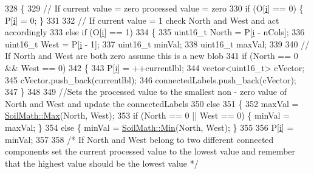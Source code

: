 \begin{DoxyCode}
328             \{
329                 \textcolor{comment}{// If current value = zero processed value = zero}
330                 \textcolor{keywordflow}{if} (O[\hyperlink{_comparision_pictures_2_createtest_image_8m_a6f6ccfcf58b31cb6412107d9d5281426}{i}] == 0) \{ P[\hyperlink{_comparision_pictures_2_createtest_image_8m_a6f6ccfcf58b31cb6412107d9d5281426}{i}] = 0; \}
331 
332                 \textcolor{comment}{// If current value = 1 check North and West and act accordingly}
333                 \textcolor{keywordflow}{else} \textcolor{keywordflow}{if} (O[\hyperlink{_comparision_pictures_2_createtest_image_8m_a6f6ccfcf58b31cb6412107d9d5281426}{i}] == 1)
334                 \{
335                     uint16\_t North = P[\hyperlink{_comparision_pictures_2_createtest_image_8m_a6f6ccfcf58b31cb6412107d9d5281426}{i} - nCols];
336                     uint16\_t West = P[\hyperlink{_comparision_pictures_2_createtest_image_8m_a6f6ccfcf58b31cb6412107d9d5281426}{i} - 1];
337                     uint16\_t minVal;
338                     uint16\_t maxVal;
339 
340                     \textcolor{comment}{// If North and West are both zero assume this is a new blob}
341                     \textcolor{keywordflow}{if} (North == 0 && West == 0)
342                     \{
343                         P[\hyperlink{_comparision_pictures_2_createtest_image_8m_a6f6ccfcf58b31cb6412107d9d5281426}{i}] = ++currentlbl;
344                         vector<uint16\_t> cVector;
345                         cVector.push\_back(currentlbl);
346                         connectedLabels.push\_back(cVector);
347                     \}
348 
349                     \textcolor{comment}{//Sets the processed value to the smallest non - zero value of North and West and
       update the connectedLabels}
350                     \textcolor{keywordflow}{else}
351                     \{
352                         maxVal = \hyperlink{namespace_soil_math_a9d385c44fb7e60a278a6eee8446f7b64}{SoilMath::Max}(North, West);
353                         \textcolor{keywordflow}{if} (North == 0 || West == 0) \{ minVal = maxVal; \}
354                         \textcolor{keywordflow}{else} \{ minVal = \hyperlink{namespace_soil_math_ad458fb6889451aa72a4a7097d10490a5}{SoilMath::Min}(North, West); \}
355 
356                         P[\hyperlink{_comparision_pictures_2_createtest_image_8m_a6f6ccfcf58b31cb6412107d9d5281426}{i}] = minVal;
357 
358                         \textcolor{comment}{/* If North and West belong to two different connected components set the current
       processed value to the lowest value and remember that the highest value should be the lowest value */}

\end{DoxyCode}

